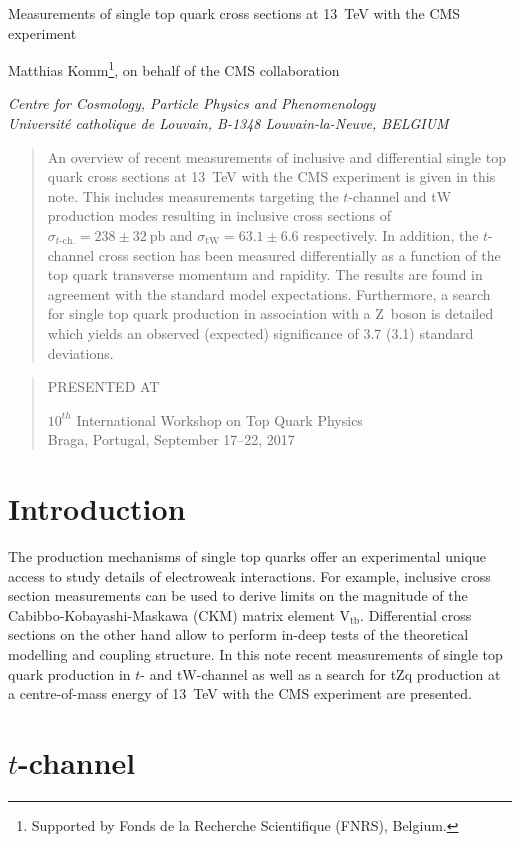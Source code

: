 \documentclass[12pt]{article}
\newcommand\pubnumber{}
\newcommand\pubdate{\today}
\def\institute{Centre for Cosmology, Particle Physics and Phenomenology\\
Universit\'e catholique de Louvain, B-1348 Louvain-la-Neuve, BELGIUM}
\def\support{\footnote{Supported by Fonds de la Recherche Scientifique (FNRS), Belgium.}}
\def\Title#1{\begin{center} {\Large #1 } \end{center}}
\def\Author#1{\begin{center}{ \sc #1} \end{center}}
\def\Address#1{\begin{center}{ \it #1} \end{center}}
\newcommand\pubblock{\rightline{\begin{tabular}{l} \pubnumber\\
         \pubdate  \end{tabular}}}
\newenvironment{Abstract}{\begin{quotation}  }{\end{quotation}}
\newenvironment{Presented}{\begin{quotation} \begin{center} 
             PRESENTED AT\end{center}\bigskip 
      \begin{center}\begin{large}}{\end{large}\end{center} \end{quotation}}
\begin{document}
\begin{titlepage}
\pubblock

\vfill
\Title{Measurements of single top quark cross sections at 13~TeV with the CMS experiment}
\vfill
\Author{Matthias Komm\support, on behalf of the CMS collaboration}
\Address{\institute}
\vfill
\begin{Abstract}
An overview of recent measurements of inclusive and differential single top quark cross sections at 13~TeV with the CMS experiment is given in this note. This includes measurements targeting the $t$-channel and tW production modes resulting in inclusive cross sections of $\sigma_{t\mathrm{\mbox{-}ch.}}=238\pm32~\mathrm{pb}$ and $\sigma_\mathrm{tW}=63.1\pm6.6$ respectively. In addition, the $t$-channel cross section has been measured differentially as a function of the top quark transverse momentum and rapidity. The results are found in agreement with the standard model expectations. Furthermore, a search for single top quark production in association with a Z~boson is detailed which yields an observed (expected) significance of 3.7 (3.1) standard deviations. 
\end{Abstract}
\vfill
\begin{Presented}
$10^{th}$ International Workshop on Top Quark Physics\\
Braga, Portugal,  September 17--22, 2017
\end{Presented}
\vfill
\end{titlepage}
\def\thefootnote{\fnsymbol{footnote}}
\setcounter{footnote}{0}
%

\section{Introduction}

The production mechanisms of single top quarks offer an experimental unique access to study details of electroweak interactions. For example, inclusive cross section measurements can be used to derive limits on the magnitude of the Cabibbo-Kobayashi-Maskawa (CKM) matrix element $\mathrm{V}_\mathrm{tb}$. Differential cross sections on the other hand allow to perform in-deep tests of the theoretical modelling and coupling structure. In this note recent measurements of single top quark production in $t$- and tW-channel as well as a search for tZq production at a centre-of-mass energy of 13~TeV with the CMS experiment are presented.


\section{$t$-channel}
\end{document}
